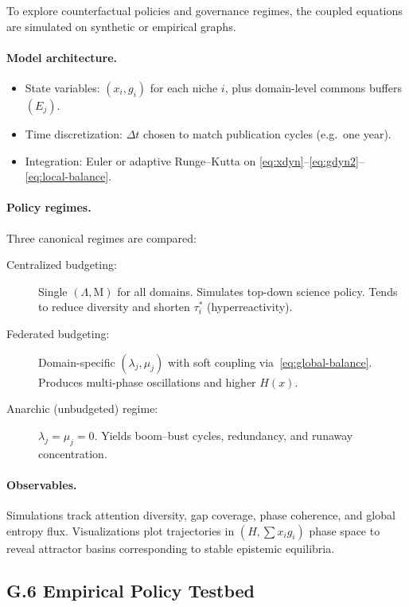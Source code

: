 \documentclass[11pt,a4paper,titlepage]{article}
\theoremstyle{definition}
\begin{document}
\begin{itemize}
To explore counterfactual policies and governance regimes, the coupled equations are simulated on synthetic or empirical graphs.

\paragraph{Model architecture.}
\begin{itemize}
\item State variables: $(x_i, g_i)$ for each niche $i$, plus domain-level commons buffers $(E_j)$.
\item Time discretization: $\Delta t$ chosen to match publication cycles (e.g.\ one year).
\item Integration: Euler or adaptive Runge–Kutta on \eqref{eq:xdyn}–\eqref{eq:gdyn2}–\eqref{eq:local-balance}.
\end{itemize}

\paragraph{Policy regimes.}
Three canonical regimes are compared:

\begin{description}
\item[Centralized budgeting:] Single $(\Lambda,\mathrm{M})$ for all domains.  
Simulates top-down science policy.  
Tends to reduce diversity and shorten $\tau_i^\ast$ (hyperreactivity).
\item[Federated budgeting:] Domain-specific $(\lambda_j,\mu_j)$ with soft coupling via~\eqref{eq:global-balance}.  
Produces multi-phase oscillations and higher $H(x)$.
\item[Anarchic (unbudgeted) regime:] $\lambda_j\!=\!\mu_j\!=\!0$.  
Yields boom–bust cycles, redundancy, and runaway concentration.
\end{description}

\paragraph{Observables.}
Simulations track attention diversity, gap coverage, phase coherence, and global entropy flux.
Visualizations plot trajectories in $(H,\sum x_i g_i)$ phase space to reveal attractor basins corresponding to stable epistemic equilibria.

\subsection*{G.6 Empirical Policy Testbed}


\end{itemize}
\end{document}
